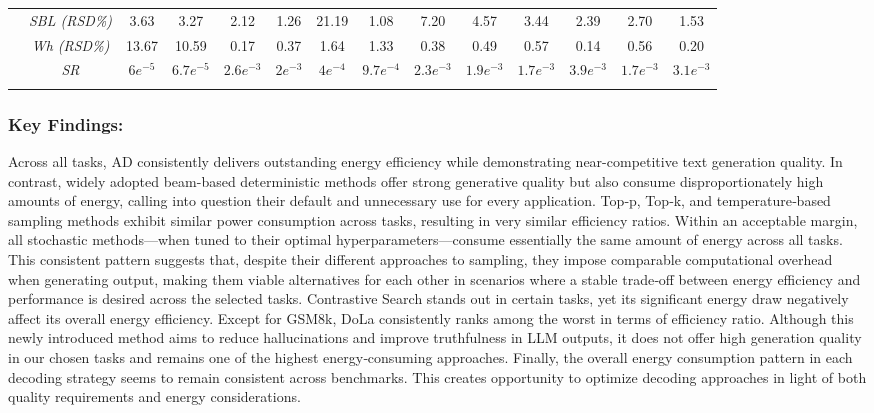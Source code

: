 \begin{table*}[h]
{\begin{tabular}{!{\vrule width 1.2pt}>{\centering\arraybackslash}p{2cm}|c!{\vrule width 1.2pt}c|c|c|c|c|c!{\vrule width 1.2pt}c|c|c|c|c|c!{\vrule width 1.2pt}}
 & \textit{SBL (RSD\%)} & 3.63 & 3.27 & 2.12 & 1.26 & 21.19 & 1.08 & 7.20 & 4.57 & 3.44 & 2.39 & 2.70 & 1.53 \\
& \textit{Wh (RSD\%)} & 13.67 & 10.59 & 0.17 & 0.37 & 1.64 & 1.33 & 0.38 & 0.49 & 0.57 & 0.14 & 0.56 & 0.20 \\
& \textit{SR} & \(6e^{-5}\) & \(6.7e^{-5}\) & \(2.6e^{-3}\) & \(2e^{-3}\) & \(4e^{-4}\) & \(9.7e^{-4}\) & \(2.3e^{-3}\) & \(1.9e^{-3}\) & \(1.7e^{-3}\) & \(3.9e^{-3}\) & \(1.7e^{-3}\) & \(3.1e^{-3}\) \\
\end{tabular}  
} %
\vskip -0.1in
\end{table*}

\subsubsection{Key Findings:} 
Across all tasks, AD consistently delivers outstanding energy efficiency while demonstrating near-competitive text generation quality. In contrast, widely adopted beam-based deterministic methods offer strong generative quality but also consume disproportionately high amounts of energy, calling into question their default and unnecessary use for every application. Top‐p, Top‐k, and temperature‐based sampling methods exhibit similar power consumption across tasks, resulting in very similar efficiency ratios. Within an acceptable margin, all stochastic methods—when tuned to their optimal hyperparameters—consume essentially the same amount of energy across all tasks. This consistent pattern suggests that, despite their different approaches to sampling, they impose comparable computational overhead when generating output, making them viable alternatives for each other in scenarios where a stable trade‐off between energy efficiency and performance is desired across the selected tasks. Contrastive Search stands out in certain tasks, yet its significant energy draw negatively affect its overall energy efficiency. Except for GSM8k, DoLa consistently ranks among the worst in terms of efficiency ratio. Although this newly introduced method aims to reduce hallucinations and improve truthfulness in LLM outputs, it does not offer high generation quality in our chosen tasks and remains one of the highest energy‐consuming approaches. Finally, the overall energy consumption pattern in each decoding strategy seems to remain consistent across benchmarks. This creates opportunity to optimize decoding approaches in light of both quality requirements and energy considerations.


